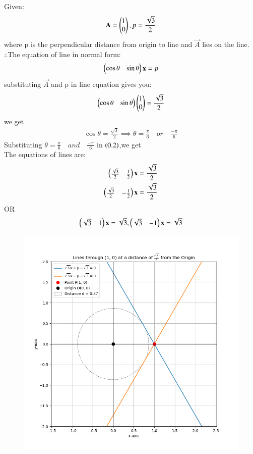\documentclass[journal]{IEEEtran}
\begin{document}
\solution
Given:
\begin{align}
    \mathbf{A}=\begin{pmatrix}1\\0\end{pmatrix},p=\frac{\sqrt{3}}{2}
\end{align}
where p is the perpendicular distance from origin to line and $\vec{A}$ lies on the line.\\
$\therefore$The equation of line in normal form:
\begin{align}
    \begin{pmatrix}\cos\theta & \sin\theta\end{pmatrix}\mathbf{x}=p
\end{align}
substituting $\vec{A}$ and p in line equation gives you:
\begin{align}
    \begin{pmatrix}\cos\theta & \sin\theta\end{pmatrix}\begin{pmatrix}1\\0\end{pmatrix}=\frac{\sqrt{3}}{2}\\
\end{align}
we get
\begin{align}
    \cos\theta=\frac{\sqrt{3}}{2}\implies \theta=\frac{\pi}{6}\quad or \quad \frac{-\pi}{6}
\end{align}
Substituting $\theta=\frac{\pi}{6}\quad and \quad \frac{-\pi}{6}$ in $\left(0.2\right)$,we get\\
The equations of lines are:
\begin{align}
    \begin{pmatrix}\frac{\sqrt{3}}{2} & \frac{1}{2}\end{pmatrix}\mathbf{x}=\frac{\sqrt{3}}{2}\\
    \begin{pmatrix}\frac{\sqrt{3}}{2} & -\frac{1}{2}\end{pmatrix}\mathbf{x}=\frac{\sqrt{3}}{2}
\end{align}
OR
\begin{align}
 \begin{pmatrix}\sqrt{3} & 1\end{pmatrix}\mathbf{x}=\sqrt{3},
    \begin{pmatrix}\sqrt{3} & -1\end{pmatrix}\mathbf{x}=\sqrt{3}   
\end{align}
\newpage
 \begin{figure}
    \centering
    \includegraphics[width=0.9\columnwidth]{figs/Figure_1.png}
    \label{fig:placeholder}
    \caption{}
\end{figure}
\end{document}
